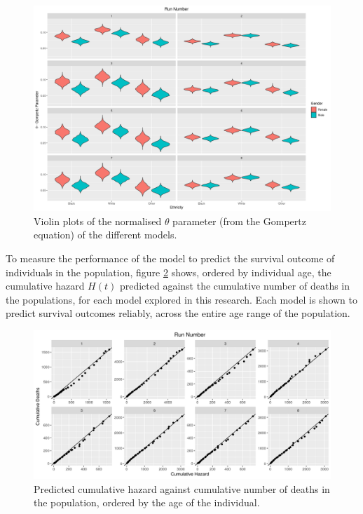 \documentclass[
]{article}
\begin{document}
\begin{figure}
\hypertarget{fig:gompt}{%
\centering
\includegraphics{./Plots/gompertz/theta_parameter.png}
\caption{Violin plots of the normalised \(\theta\) parameter (from the
Gompertz equation) of the different models.}\label{fig:gompt}
}
\end{figure}

To measure the performance of the model to predict the survival outcome
of individuals in the population, figure \ref{fig:cumpred} shows,
ordered by individual age, the cumulative hazard \(H(t)\) predicted
against the cumulative number of deaths in the populations, for each
model explored in this research. Each model is shown to predict survival
outcomes reliably, across the entire age range of the population.

\begin{figure}
\hypertarget{fig:cumpred}{%
\centering
\includegraphics{./Plots/Survival/redlinpred_Cumulative_haz-death_age.png}
\caption{Predicted cumulative hazard against cumulative number of deaths
in the population, ordered by the age of the
individual.}\label{fig:cumpred}
}
\end{figure}
\end{document}
